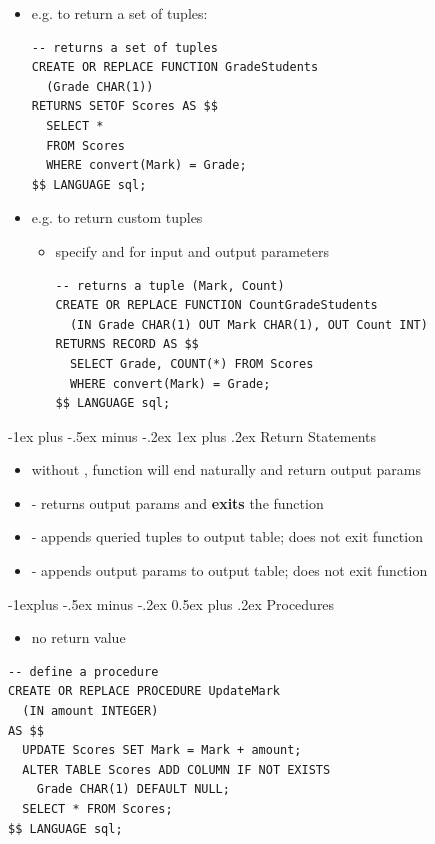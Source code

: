 \documentclass[10pt, landscape]{article}
\makeatletter
\renewcommand{\subsection}{\@startsection{subsection}{2}{0mm}%
  {-1explus -.5ex minus -.2ex}%
  {0.5ex plus .2ex}%
{\normalfont\normalsize\bfseries}}
\renewcommand{\subsubsection}{\@startsection{subsubsection}{3}{0mm}%
  {-1ex plus -.5ex minus -.2ex}%
  {1ex plus .2ex}%
{\normalfont\small\bfseries}}%
\makeatother
\begin{document}
\begin{multicols}{3}
  \begin{itemize}
    \item e.g. to return a set of tuples: 
      \begin{lstlisting}[style=mySQL]
-- returns a set of tuples
CREATE OR REPLACE FUNCTION GradeStudents 
  (Grade CHAR(1))
RETURNS SETOF Scores AS $$ 
  SELECT *
  FROM Scores
  WHERE convert(Mark) = Grade;
$$ LANGUAGE sql;
      \end{lstlisting}
    \item e.g. to return custom tuples
      \begin{itemize}
        \item specify  and  for input and output parameters
          \begin{lstlisting}[style=mySQL]
-- returns a tuple (Mark, Count)
CREATE OR REPLACE FUNCTION CountGradeStudents
  (IN Grade CHAR(1) OUT Mark CHAR(1), OUT Count INT)
RETURNS RECORD AS $$  
  SELECT Grade, COUNT(*) FROM Scores
  WHERE convert(Mark) = Grade;
$$ LANGUAGE sql;
          \end{lstlisting}
      \end{itemize}
  \end{itemize}


  \subsubsection{Return Statements}
  \begin{itemize}
    \item without , function will end naturally and return output params
    \item {} - returns output params and \textbf{exits} the function
    \item {} - appends queried tuples to output table; does not exit function
    \item {} - appends output params to output table; does not exit function
  \end{itemize}

  \subsection{Procedures}
  \begin{itemize}
    \item no return value
  \end{itemize}
  \begin{lstlisting}[style=mySQL]
-- define a procedure
CREATE OR REPLACE PROCEDURE UpdateMark
  (IN amount INTEGER)
AS $$
  UPDATE Scores SET Mark = Mark + amount;
  ALTER TABLE Scores ADD COLUMN IF NOT EXISTS
    Grade CHAR(1) DEFAULT NULL;
  SELECT * FROM Scores;
$$ LANGUAGE sql;


\end{lstlisting}
\end{multicols}
\end{document}
